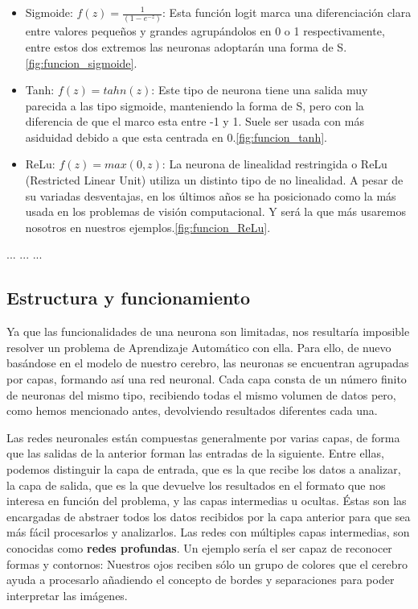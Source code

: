 \begin{itemize}
    \item Sigmoide: $f(z) = \frac{1}{(1-e^{-z})}$: Esta función logit marca una diferenciación clara entre valores pequeños y grandes agrupándolos en 0 o 1 respectivamente, entre estos dos extremos las neuronas adoptarán una forma de S.\ref{fig:funcion_sigmoide}.
    \item Tanh: $f(z)= tahn(z)$: Este tipo de neurona tiene una salida muy parecida a las tipo sigmoide, manteniendo la forma de S, pero con la diferencia de que el marco esta entre -1 y 1. Suele ser usada con más asiduidad debido a que esta centrada en 0.\ref{fig:funcion_tanh}.
    \item ReLu: $f(z) = max(0,z)$: La neurona de linealidad restringida o ReLu (Restricted Linear Unit) utiliza un distinto tipo de no linealidad. A pesar de su variadas desventajas, en los últimos años se ha posicionado como la más usada en los problemas de visión computacional. Y será la que más usaremos nosotros en nuestros ejemplos.\ref{fig:funcion_ReLu}.
\end{itemize}

%
       {...}
%
       {...}
%
       {...}

\subsection{Estructura y funcionamiento}
Ya que las funcionalidades de una neurona son limitadas, nos resultaría imposible resolver un problema de Aprendizaje Automático con ella. Para ello, de nuevo basándose en el modelo de nuestro cerebro, las neuronas se encuentran agrupadas por capas, formando así una red neuronal. Cada capa consta de un número finito de neuronas del mismo tipo, recibiendo todas el mismo volumen de datos pero, como hemos mencionado antes, devolviendo resultados diferentes cada una.

Las redes neuronales están compuestas generalmente por varias capas, de forma que las salidas de la anterior forman las entradas de la siguiente. Entre ellas, podemos distinguir la capa de entrada, que es la que recibe los datos a analizar, la capa de salida, que es la que devuelve los resultados en el formato que nos interesa en función del problema, y las capas intermedias u ocultas. Éstas son las encargadas de abstraer todos los datos recibidos por la capa anterior para que sea más fácil procesarlos y analizarlos. Las redes con múltiples capas intermedias, son conocidas como \textbf{redes profundas}. Un ejemplo sería el ser capaz de reconocer formas y contornos: Nuestros ojos reciben sólo un grupo de colores que el cerebro ayuda a procesarlo añadiendo el concepto de bordes y separaciones para poder interpretar las imágenes.

